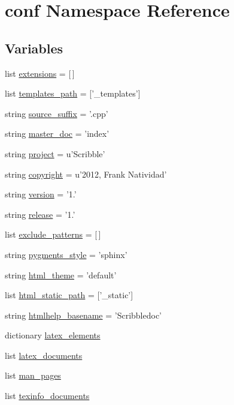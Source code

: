 \hypertarget{namespaceconf}{\section{conf \-Namespace \-Reference}
\label{namespaceconf}
}
\subsection*{\-Variables}
\begin{DoxyCompactItemize}
\item 
list \hyperlink{namespaceconf_a540efa67c53e84c1c353c1df2e37e39c}{extensions} = \mbox{[}$\,$\mbox{]}
\item 
list \hyperlink{namespaceconf_af50129dcc1f90655539f025595a3093b}{templates\-\_\-path} = \mbox{[}'\-\_\-templates'\mbox{]}
\item 
string \hyperlink{namespaceconf_a1e0ba7f4cb1d50fa831f1236a77d60f6}{source\-\_\-suffix} = '.cpp'
\item 
string \hyperlink{namespaceconf_ae22a29d94a222730836db739d6dbd71e}{master\-\_\-doc} = 'index'
\item 
string \hyperlink{namespaceconf_aa2c6aefbed1597a70cfb45a760e5977c}{project} = u'\-Scribble'
\item 
string \hyperlink{namespaceconf_ac8ccf456b321bc9052c0691a173b6925}{copyright} = u'2012, \-Frank \-Natividad'
\item 
string \hyperlink{namespaceconf_a93370314d5e59e93dabf67ca4906c634}{version} = '1.'
\item 
string \hyperlink{namespaceconf_a90a599726178800ad5a42f6bc2cd5208}{release} = '1.'
\item 
list \hyperlink{namespaceconf_aa01918cfe75aed3ae059dd96c71c8f08}{exclude\-\_\-patterns} = \mbox{[}$\,$\mbox{]}
\item 
string \hyperlink{namespaceconf_afa4e4ed164119ef5f4656e9554ed1f1b}{pygments\-\_\-style} = 'sphinx'
\item 
string \hyperlink{namespaceconf_a7f1b143ff25817758abd21a7db110510}{html\-\_\-theme} = 'default'
\item 
list \hyperlink{namespaceconf_acb91fefcfd3aa6f3529fa682ab834832}{html\-\_\-static\-\_\-path} = \mbox{[}'\-\_\-static'\mbox{]}
\item 
string \hyperlink{namespaceconf_a74d707b34bba474e9057f383ad01de83}{htmlhelp\-\_\-basename} = '\-Scribbledoc'
\item 
dictionary \hyperlink{namespaceconf_a82b98d5b4f4b8dee5476fb983fd85407}{latex\-\_\-elements}
\item 
list \hyperlink{namespaceconf_a00b7896473527f894006130b1113cb4b}{latex\-\_\-documents}
\item 
list \hyperlink{namespaceconf_a45cae4ca704c12a150b112eb1b66d0b1}{man\-\_\-pages}
\item 
list \hyperlink{namespaceconf_a22cc2d5df880ae78ca10c4675b494602}{texinfo\-\_\-documents}
\end{DoxyCompactItemize}


